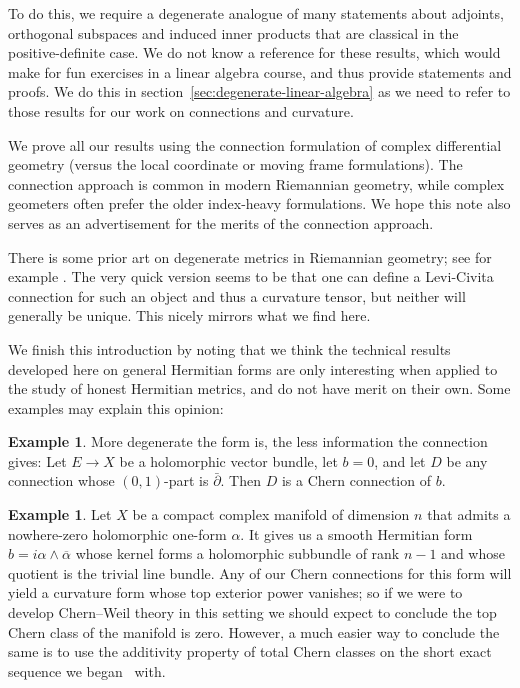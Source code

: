 \documentclass[10pt,a4paper]{amsart}
\theoremstyle{definition}
\newtheorem{exam}[theo]{Example}
\def\ov#1{\overline{#1}}
\begin{document}
To do this, we require a degenerate analogue of many statements about adjoints,
orthogonal subspaces and induced inner products that are classical in the
positive-definite case. We do not know a reference for these results, which
would make for fun exercises in a linear algebra course, and thus provide
statements and proofs. We do this in
section~\ref{sec:degenerate-linear-algebra} as we need to refer to those
results for our work on connections and curvature.

We prove all our results using the connection formulation of complex
differential geometry (versus the local coordinate or moving frame
formulations). The connection approach is common in modern Riemannian geometry,
while complex geometers often prefer the older index-heavy formulations. We hope
this note also serves as an advertisement for the merits of the connection
approach.

There is some prior art on degenerate metrics in Riemannian geometry; see for example \cite{bel1975degenerate,stoica2011cartan,stoica2014singular}.
The very quick version seems to be that one can define a Levi-Civita connection
for such an object and thus a curvature tensor, but neither will generally be
unique. This nicely mirrors what we find here.


We finish this introduction by noting that we think the technical results
developed here on general Hermitian forms are only interesting when applied to
the study of honest Hermitian metrics, and do not have merit on their own. Some
examples may explain this opinion:


\begin{exam}
More degenerate the form is, the less information the connection gives:
Let $E \to X$ be a holomorphic vector bundle, let $b = 0$, and let $D$ be any connection whose $(0,1)$-part is $\bar\partial$. Then $D$ is a Chern connection of $b$.
\end{exam}


\begin{exam}
Let $X$ be a compact complex manifold of dimension $n$
that admits a nowhere-zero holomorphic one-form $\alpha$.
It  gives us a smooth Hermitian form $b = i \alpha \wedge \ov \alpha$ whose kernel forms a holomorphic subbundle of rank $n-1$ and whose quotient is the trivial line bundle.
Any of our Chern connections for this form will yield a curvature form whose
top exterior power vanishes; so if we were to develop Chern--Weil theory in
this setting we should expect to conclude the top Chern class of the manifold
is zero. However, a much easier way to conclude the same is to use the
additivity property of total Chern classes on the short exact sequence we began
~with.%
\end{exam}
\end{document}
